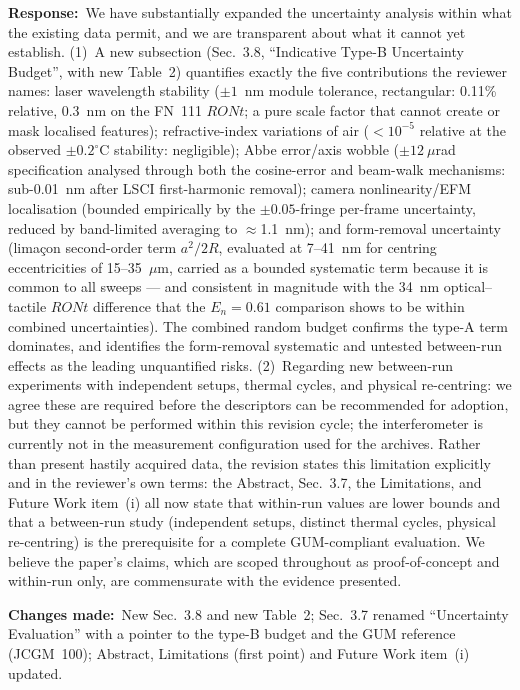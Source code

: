 \documentclass[11pt,a4paper]{article}
\newcommand{\response}{\par\noindent\textbf{Response:}\ }
\newcommand{\changes}{\par\noindent\textbf{Changes made:}\ }
\begin{document}
\response We have substantially expanded the uncertainty analysis within what the existing data permit, and we are transparent about what it cannot yet establish. (1)~A new subsection (Sec.~3.8, ``Indicative Type-B Uncertainty Budget'', with new Table~2) quantifies exactly the five contributions the reviewer names: laser wavelength stability ($\pm1$~nm module tolerance, rectangular: 0.11\% relative, 0.3~nm on the FN~111 $RONt$; a pure scale factor that cannot create or mask localised features); refractive-index variations of air ($<10^{-5}$ relative at the observed $\pm0.2^{\circ}$C stability: negligible); Abbe error/axis wobble ($\pm12~\mu$rad specification analysed through both the cosine-error and beam-walk mechanisms: sub-0.01~nm after LSCI first-harmonic removal); camera nonlinearity/EFM localisation (bounded empirically by the $\pm0.05$-fringe per-frame uncertainty, reduced by band-limited averaging to $\approx$1.1~nm); and form-removal uncertainty (lima\c{c}on second-order term $a^2/2R$, evaluated at 7--41~nm for centring eccentricities of 15--35~$\mu$m, carried as a bounded systematic term because it is common to all sweeps --- and consistent in magnitude with the 34~nm optical--tactile $RONt$ difference that the $E_n=0.61$ comparison shows to be within combined uncertainties). The combined random budget confirms the type-A term dominates, and identifies the form-removal systematic and untested between-run effects as the leading unquantified risks. (2)~Regarding new between-run experiments with independent setups, thermal cycles, and physical re-centring: we agree these are required before the descriptors can be recommended for adoption, but they cannot be performed within this revision cycle; the interferometer is currently not in the measurement configuration used for the archives. Rather than present hastily acquired data, the revision states this limitation explicitly and in the reviewer's own terms: the Abstract, Sec.~3.7, the Limitations, and Future Work item~(i) all now state that within-run values are lower bounds and that a between-run study (independent setups, distinct thermal cycles, physical re-centring) is the prerequisite for a complete GUM-compliant evaluation. We believe the paper's claims, which are scoped throughout as proof-of-concept and within-run only, are commensurate with the evidence presented.
\changes New Sec.~3.8 and new Table~2; Sec.~3.7 renamed ``Uncertainty Evaluation'' with a pointer to the type-B budget and the GUM reference (JCGM~100); Abstract, Limitations (first point) and Future Work item~(i) updated.
\end{document}

